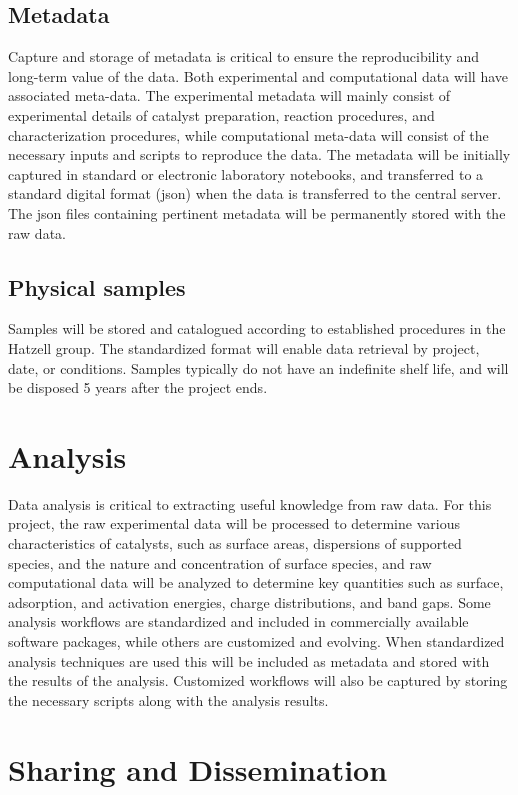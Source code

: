 \subsection{Metadata}
Capture and storage of metadata is critical to ensure the reproducibility and long-term value of the data. Both experimental and computational data will have associated meta-data. The experimental metadata will mainly consist of experimental details of catalyst preparation, reaction procedures, and characterization procedures, while computational meta-data will consist of the necessary inputs and scripts to reproduce the data. The metadata will be initially captured in standard or electronic laboratory notebooks, and transferred to a standard digital format (json) when the data is transferred to the central server. The json files containing pertinent metadata will be permanently stored with the raw data.

\subsection{Physical samples}
Samples will be stored and catalogued according to established procedures in the Hatzell group. The standardized format will enable data retrieval by project, date, or conditions. Samples typically do not have an indefinite shelf life, and will be disposed 5 years after the project ends.

\section{Analysis}
Data analysis is critical to extracting useful knowledge from raw data. For this project, the raw experimental data will be processed to determine various characteristics of catalysts, such as surface areas, dispersions of supported species, and the nature and concentration of surface species, and raw computational data will be analyzed to determine key quantities such as surface, adsorption, and activation energies, charge distributions, and band gaps. Some analysis workflows are standardized and included in commercially available software packages, while others are customized and evolving. When standardized analysis techniques are used this will be included as metadata and stored with the results of the analysis. Customized workflows will also be captured by storing the necessary scripts along with the analysis results.

\section{Sharing and Dissemination}

